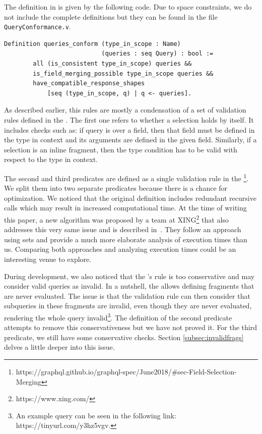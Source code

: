 The definition in \coql{} is given by the following code. Due to space constraints, we do not include the complete definitions but they can be found in the file \texttt{QueryConformance.v}.

\begin{verbatim}
Definition queries_conform (type_in_scope : Name)
                           (queries : seq Query) : bool :=
        all (is_consistent type_in_scope) queries &&
        is_field_merging_possible type_in_scope queries &&
        have_compatible_response_shapes
            [seq (type_in_scope, q) | q <- queries].
\end{verbatim}

As described earlier, this rules are mostly a condensation of a set of validation rules defined in the \spec{}. The first one refers to whether a selection holds by itself. It includes checks such as: if query is over a field, then that field must be defined in the  type in context and its arguments are defined in the given field. Similarly, if a selection is an inline fragment, then the type condition has to be valid with respect to the type in context.

The second and third predicates are defined as a single validation rule in the \spec{}\footnote{https://graphql.github.io/graphql-spec/June2018/\#sec-Field-Selection-Merging}. We split them into two separate predicates because there is a chance for optimization. We noticed that the original definition includes redundant recursive calls which may result in increased computational time. At the time of writing this paper, a new algorithm was proposed by a team at XING\footnote{https://www.xing.com/} that also addresses this very same issue and is described in~\cite{xingalg}. They follow an approach using sets and provide a much more elaborate analysis of execution times than us. Comparing both approaches and analyzing execution times could be an interesting venue to explore.

During development, we also noticed that the \spec{}'s rule is too conservative and may consider valid queries as invalid. In a nutshell, the \spec{} allows defining fragments that are never evaluated. The issue is that the validation rule can then consider that subqueries in these fragments are invalid, even though they are never evaluated, rendering the whole query invalid\footnote{An example query can be seen in the following link: https://tinyurl.com/y3hz5vgv.}. The definition of the second predicate attempts to remove this conservativeness but we have not proved it. For the third predicate, we still have some conservative checks. Section \ref{subsec:invalidfrags} delves a little deeper into this issue.

